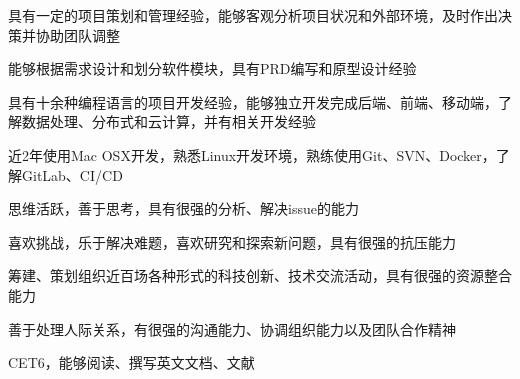


\begin{cventries}


\ljycventry
{
\begin{cvitems}
\item {具有一定的项目策划和管理经验，能够客观分析项目状况和外部环境，及时作出决策并协助团队调整}
\item {能够根据需求设计和划分软件模块，具有PRD编写和原型设计经验}
\item {具有十余种编程语言的项目开发经验，能够独立开发完成后端、前端、移动端，了解数据处理、分布式和云计算，并有相关开发经验}
\item{近2年使用Mac OSX开发，熟悉Linux开发环境，熟练使用Git、SVN、Docker，了解GitLab、CI/CD}
\item{思维活跃，善于思考，具有很强的分析、解决issue的能力}
\item{喜欢挑战，乐于解决难题，喜欢研究和探索新问题，具有很强的抗压能力}
\item{筹建、策划组织近百场各种形式的科技创新、技术交流活动，具有很强的资源整合能力}
\item{善于处理人际关系，有很强的沟通能力、协调组织能力以及团队合作精神}
\item{CET6，能够阅读、撰写英文文档、文献}
\end{cvitems}
}

\end{cventries}

